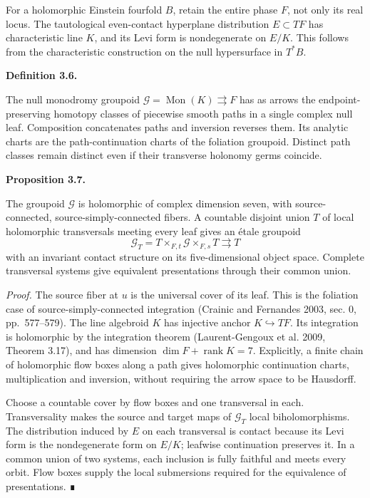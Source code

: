 \documentclass[
  english,
  11pt,
  reqno]{amsart}
\makeatletter
\newcommand{\pandocstatementheading}[1]{%
  \par\addpenalty{\@beginparpenalty}%
  \addvspace{.5\baselineskip plus .2\baselineskip minus .2\baselineskip}%
  {\normalfont\bfseries #1\par}%
  \nobreak\@afterindenttrue\@afterheading
}
\makeatother
\begin{document}
For a holomorphic Einstein fourfold \(B\), retain the entire phase
\(F\), not only its real locus. The tautological even-contact hyperplane
distribution \(E\subset TF\) has characteristic line \(K\), and its Levi
form is nondegenerate on \(E/K\). This follows from the characteristic
construction on the null hypersurface in \(T^*B\).

\pandocstatementheading{\protect{}\label{def:null-monodromy-groupoid}Definition 3.6.}

The null monodromy groupoid
\(\mathcal G=\operatorname{Mon}(K)\rightrightarrows F\) has as arrows
the endpoint-preserving homotopy classes of piecewise smooth paths in a
single complex null leaf. Composition concatenates paths and inversion
reverses them. Its analytic charts are the path-continuation charts of
the foliation groupoid. Distinct path classes remain distinct even if
their transverse holonomy germs coincide.

\pandocstatementheading{\protect{}\label{prop:holomorphic-null-monodromy}Proposition 3.7.}

The groupoid \(\mathcal G\) is holomorphic of complex dimension seven,
with source-connected, source-simply-connected fibers. A countable
disjoint union \(T\) of local holomorphic transversals meeting every
leaf gives an étale groupoid \[
\mathcal G_T=T\times_{F,t}\mathcal G\times_{F,s}T\rightrightarrows T
\] with an invariant contact structure on its five-dimensional object
space. Complete transversal systems give equivalent presentations
through their common union.

\emph{Proof.} The source fiber at \(u\) is the universal cover of its
leaf. This is the foliation case of source-simply-connected integration
(Crainic and Fernandes 2003, sec. 0, pp.~577--579). The line algebroid
\(K\) has injective anchor \(K\hookrightarrow TF\). Its integration is
holomorphic by the integration theorem (Laurent-Gengoux et al. 2009,
Theorem 3.17), and has dimension \(\dim F+\operatorname{rank}K=7\).
Explicitly, a finite chain of holomorphic flow boxes along a path gives
holomorphic continuation charts, multiplication and inversion, without
requiring the arrow space to be Hausdorff.

Choose a countable cover by flow boxes and one transversal in each.
Transversality makes the source and target maps of \(\mathcal G_T\)
local biholomorphisms. The distribution induced by \(E\) on each
transversal is contact because its Levi form is the nondegenerate form
on \(E/K\); leafwise continuation preserves it. In a common union of two
systems, each inclusion is fully faithful and meets every orbit. Flow
boxes supply the local submersions required for the equivalence of
presentations. ∎
\end{document}
